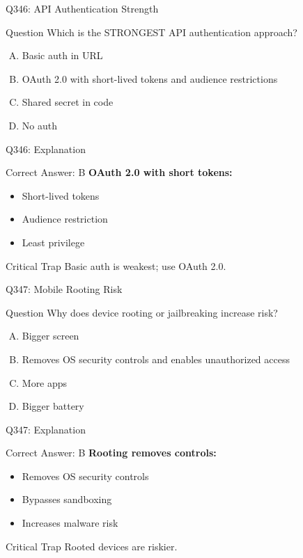 \documentclass{beamer}
\begin{document}
	\begin{frame}{Q346: API Authentication Strength}
		\begin{block}{Question}
			Which is the STRONGEST API authentication approach?
		\end{block}
		\begin{enumerate}[(A)]
			\item Basic auth in URL
			\item OAuth 2.0 with short-lived tokens and audience restrictions
			\item Shared secret in code
			\item No auth
		\end{enumerate}
	\end{frame}
	
	\begin{frame}{Q346: Explanation}
		\begin{block}{Correct Answer: B}
			\textbf{OAuth 2.0 with short tokens:}
			\begin{itemize}
				\item Short-lived tokens
				\item Audience restriction
				\item Least privilege
			\end{itemize}
		\end{block}
		\begin{alertblock}{Critical Trap}
			Basic auth is weakest; use OAuth 2.0.
		\end{alertblock}
	\end{frame}
	
	\begin{frame}{Q347: Mobile Rooting Risk}
		\begin{block}{Question}
			Why does device rooting or jailbreaking increase risk?
		\end{block}
		\begin{enumerate}[(A)]
			\item Bigger screen
			\item Removes OS security controls and enables unauthorized access
			\item More apps
			\item Bigger battery
		\end{enumerate}
	\end{frame}
	
	\begin{frame}{Q347: Explanation}
		\begin{block}{Correct Answer: B}
			\textbf{Rooting removes controls:}
			\begin{itemize}
				\item Removes OS security controls
				\item Bypasses sandboxing
				\item Increases malware risk
			\end{itemize}
		\end{block}
		\begin{alertblock}{Critical Trap}
			Rooted devices are riskier.
		\end{alertblock}
	\end{frame}
	
\end{document}
